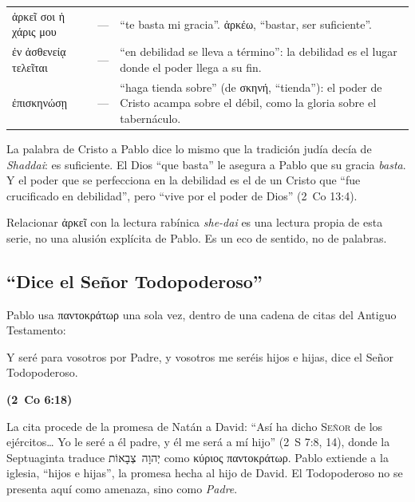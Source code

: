 \documentclass[11pt,letterpaper]{article}
\newcommand{\heb}[1]{\mbox{\foreignlanguage{hebrew}{#1}}}
\newcommand{\grc}[1]{\foreignlanguage{ancientgreek}{#1}}
\newcommand{\SENOR}{\textsc{Señor}}
\newcommand{\fuente}[1]{\par\hfill{\upshape\bfseries\small\textcolor{azul}{#1}}}
\begin{document}
\begin{filologia}[2~Co 12:9]
\begin{tabular}{@{}L{3.2cm}L{1.6cm}L{10cm}@{}}
\grc{ἀρκεῖ σοι ἡ χάρις μου} & --- & ``te basta mi gracia''. \grc{ἀρκέω}, ``bastar, ser suficiente''. \\[2pt]
\grc{ἐν ἀσθενείᾳ τελεῖται} & --- & ``en debilidad se lleva a término'': la debilidad es el lugar donde el poder llega a su fin. \\[2pt]
\grc{ἐπισκηνώσῃ} & --- & ``haga tienda sobre'' (de \grc{σκηνή}, ``tienda''): el poder de Cristo acampa sobre el débil, como la gloria sobre el tabernáculo. \\
\end{tabular}
\end{filologia}

La palabra de Cristo a Pablo dice lo mismo que la tradición judía decía de \emph{Shaddai}: es suficiente. El Dios ``que basta'' le asegura a Pablo que su gracia \emph{basta}. Y el poder que se perfecciona en la debilidad es el de un Cristo que ``fue crucificado en debilidad'', pero ``vive por el poder de Dios'' (2~Co 13:4).

\begin{nota}[Precisión]
Relacionar \grc{ἀρκεῖ} con la lectura rabínica \emph{she-dai} es una lectura propia de esta serie, no una alusión explícita de Pablo. Es un eco de sentido, no de palabras.
\end{nota}

\subsection{``Dice el Señor Todopoderoso''}

Pablo usa \grc{παντοκράτωρ} una sola vez, dentro de una cadena de citas del Antiguo Testamento:

\begin{cita}Y seré para vosotros por Padre, y vosotros me seréis hijos e hijas, dice el Señor Todopoderoso.\fuente{(2~Co 6:18)}\end{cita}

La cita procede de la promesa de Natán a David: ``Así ha dicho \SENOR{} de los ejércitos\ldots{} Yo le seré a él padre, y él me será a mí hijo'' (2~S 7:8, 14), donde la Septuaginta traduce \heb{יְהוָה צְבָאוֹת} como \grc{κύριος παντοκράτωρ}. Pablo extiende a la iglesia, ``hijos e hijas'', la promesa hecha al hijo de David. El Todopoderoso no se presenta aquí como amenaza, sino como \emph{Padre}.
\end{document}
